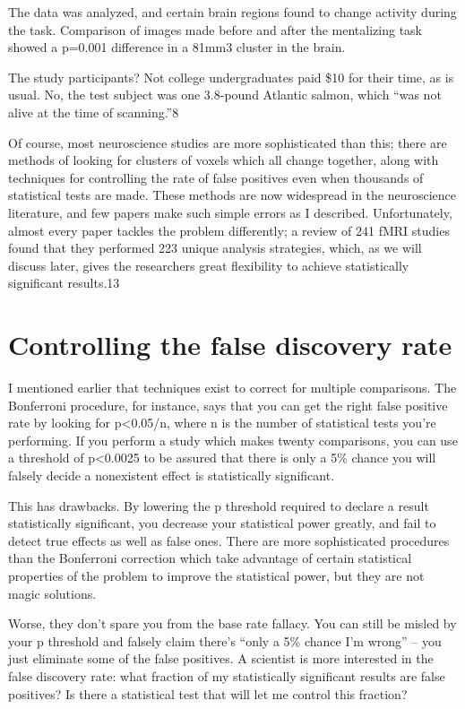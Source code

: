 The data was analyzed, and certain brain regions found to change activity during the task. Comparison of images made before and after the mentalizing task showed a p=0.001 difference in a 81mm3 cluster in the brain.

The study participants? Not college undergraduates paid \$10 for their time, as is usual. No, the test subject was one 3.8-pound Atlantic salmon, which “was not alive at the time of scanning.”8

Of course, most neuroscience studies are more sophisticated than this; there are methods of looking for clusters of voxels which all change together, along with techniques for controlling the rate of false positives even when thousands of statistical tests are made. These methods are now widespread in the neuroscience literature, and few papers make such simple errors as I described. Unfortunately, almost every paper tackles the problem differently; a review of 241 fMRI studies found that they performed 223 unique analysis strategies, which, as we will discuss later, gives the researchers great flexibility to achieve statistically significant results.13

\section{Controlling the false discovery rate}
\label{chp5:controlfalserate}

I mentioned earlier that techniques exist to correct for multiple comparisons. The Bonferroni procedure, for instance, says that you can get the right false positive rate by looking for p<0.05/n, where n is the number of statistical tests you’re performing. If you perform a study which makes twenty comparisons, you can use a threshold of p<0.0025 to be assured that there is only a 5\% chance you will falsely decide a nonexistent effect is statistically significant.

This has drawbacks. By lowering the p threshold required to declare a result statistically significant, you decrease your statistical power greatly, and fail to detect true effects as well as false ones. There are more sophisticated procedures than the Bonferroni correction which take advantage of certain statistical properties of the problem to improve the statistical power, but they are not magic solutions.

Worse, they don’t spare you from the base rate fallacy. You can still be misled by your p threshold and falsely claim there’s “only a 5\% chance I’m wrong” – you just eliminate some of the false positives. A scientist is more interested in the false discovery rate: what fraction of my statistically significant results are false positives? Is there a statistical test that will let me control this fraction?

